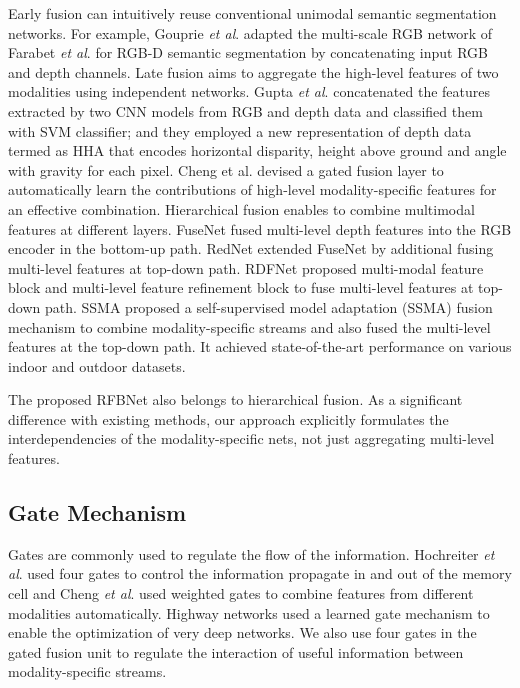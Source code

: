 \documentclass[letterpaper, 10 pt, conference]{ieeeconf}
\begin{document}
	Early fusion can intuitively reuse conventional unimodal semantic segmentation networks\cite{couprie2013indoor,shelhamer2017fully}. For example, Gouprie \textit{et al}.\cite{couprie2013indoor} adapted the multi-scale RGB network of Farabet \textit{et al}.\cite{farabet2012learning} for RGB-D semantic segmentation by concatenating input RGB and depth channels. Late fusion aims to aggregate the high-level features of two modalities using independent networks\cite{gupta2014learning,cheng2017locality,wang2016learning,song2017depth}. Gupta \textit{et al}.\cite{gupta2014learning} concatenated the features extracted by two CNN models from RGB and depth data and classified them with SVM classifier; and they employed a new representation of depth data termed as HHA that encodes horizontal disparity, height above ground and angle with gravity for each pixel. 
	Cheng et al.\cite{cheng2017locality} devised a gated fusion layer to automatically learn the contributions of high-level modality-specific features for an effective combination. Hierarchical fusion enables to combine multimodal features at different layers\cite{hazirbas2016fusenet,jiang2018rednet,park2017rdfnet,valada2019self}.
	FuseNet\cite{hazirbas2016fusenet} fused multi-level depth features into the RGB encoder in the bottom-up path. RedNet\cite{jiang2018rednet} extended FuseNet by additional fusing multi-level features at top-down path. RDFNet\cite{park2017rdfnet} proposed multi-modal feature block and multi-level feature refinement block to fuse multi-level features at top-down path.
	SSMA \cite{valada2019self} proposed a self-supervised model
	adaptation (SSMA) fusion mechanism to combine modality-specific streams and also fused the multi-level features at the top-down path. It achieved state-of-the-art performance on various indoor and outdoor datasets.
	
	The proposed RFBNet also belongs to hierarchical fusion. As a significant difference with existing methods, our approach explicitly formulates the interdependencies of the modality-specific nets, not just aggregating multi-level features.
	
	\subsection{Gate Mechanism}
	Gates are commonly used to regulate the flow of the information\cite{hochreiter1997long,cheng2017locality,li2019gff,srivastava2015training}. Hochreiter \textit{et al}.\cite{hochreiter1997long} used four gates to control the information propagate in and out of the memory cell and Cheng \textit{et al}.\cite{cheng2017locality} used weighted gates to combine features from different modalities automatically. Highway networks\cite{srivastava2015training} used a learned gate mechanism to enable the optimization of very deep networks.
	We also use four gates in the gated fusion unit to regulate the interaction of useful information between modality-specific streams.
	
\end{document}
